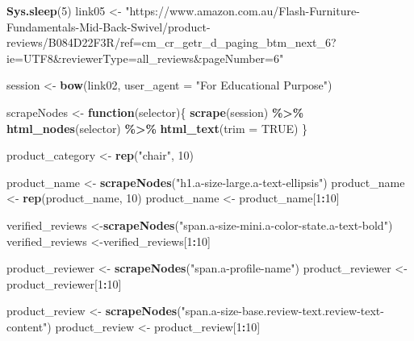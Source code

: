 \documentclass[
]{article}
\newenvironment{Shaded}{\begin{snugshade}}{\end{snugshade}}
\newcommand{\AttributeTok}[1]{\textcolor[rgb]{0.13,0.29,0.53}{#1}}
\newcommand{\ConstantTok}[1]{\textcolor[rgb]{0.56,0.35,0.01}{#1}}
\newcommand{\ControlFlowTok}[1]{\textcolor[rgb]{0.13,0.29,0.53}{\textbf{#1}}}
\newcommand{\DecValTok}[1]{\textcolor[rgb]{0.00,0.00,0.81}{#1}}
\newcommand{\FunctionTok}[1]{\textcolor[rgb]{0.13,0.29,0.53}{\textbf{#1}}}
\newcommand{\NormalTok}[1]{#1}
\newcommand{\OtherTok}[1]{\textcolor[rgb]{0.56,0.35,0.01}{#1}}
\newcommand{\SpecialCharTok}[1]{\textcolor[rgb]{0.81,0.36,0.00}{\textbf{#1}}}
\newcommand{\StringTok}[1]{\textcolor[rgb]{0.31,0.60,0.02}{#1}}
\begin{document}
\begin{Shaded}
\begin{Highlighting}[]
  \FunctionTok{Sys.sleep}\NormalTok{(}\DecValTok{5}\NormalTok{)}
\NormalTok{link05 }\OtherTok{\textless{}{-}} \StringTok{"https://www.amazon.com.au/Flash{-}Furniture{-}Fundamentals{-}Mid{-}Back{-}Swivel/product{-}reviews/B084D22F3R/ref=cm\_cr\_getr\_d\_paging\_btm\_next\_6?ie=UTF8\&reviewerType=all\_reviews\&pageNumber=6"}


\NormalTok{  session }\OtherTok{\textless{}{-}} \FunctionTok{bow}\NormalTok{(link02,}
               \AttributeTok{user\_agent =} \StringTok{"For Educational Purpose"}\NormalTok{)}

\NormalTok{  scrapeNodes }\OtherTok{\textless{}{-}} \ControlFlowTok{function}\NormalTok{(selector)\{}
    \FunctionTok{scrape}\NormalTok{(session) }\SpecialCharTok{\%\textgreater{}\%}
      \FunctionTok{html\_nodes}\NormalTok{(selector) }\SpecialCharTok{\%\textgreater{}\%}
      \FunctionTok{html\_text}\NormalTok{(}\AttributeTok{trim =} \ConstantTok{TRUE}\NormalTok{)}
\NormalTok{  \}}

\NormalTok{  product\_category }\OtherTok{\textless{}{-}} \FunctionTok{rep}\NormalTok{(}\StringTok{"chair"}\NormalTok{, }\DecValTok{10}\NormalTok{)}

\NormalTok{  product\_name }\OtherTok{\textless{}{-}} \FunctionTok{scrapeNodes}\NormalTok{(}\StringTok{"h1.a{-}size{-}large.a{-}text{-}ellipsis"}\NormalTok{)}
\NormalTok{  product\_name }\OtherTok{\textless{}{-}} \FunctionTok{rep}\NormalTok{(product\_name, }\DecValTok{10}\NormalTok{)}
\NormalTok{  product\_name }\OtherTok{\textless{}{-}}\NormalTok{ product\_name[}\DecValTok{1}\SpecialCharTok{:}\DecValTok{10}\NormalTok{]}
  
\NormalTok{  verified\_reviews }\OtherTok{\textless{}{-}}\FunctionTok{scrapeNodes}\NormalTok{(}\StringTok{"span.a{-}size{-}mini.a{-}color{-}state.a{-}text{-}bold"}\NormalTok{)}
\NormalTok{  verified\_reviews }\OtherTok{\textless{}{-}}\NormalTok{verified\_reviews[}\DecValTok{1}\SpecialCharTok{:}\DecValTok{10}\NormalTok{]}
  
\NormalTok{  product\_reviewer }\OtherTok{\textless{}{-}} \FunctionTok{scrapeNodes}\NormalTok{(}\StringTok{"span.a{-}profile{-}name"}\NormalTok{)}
\NormalTok{  product\_reviewer }\OtherTok{\textless{}{-}}\NormalTok{ product\_reviewer[}\DecValTok{1}\SpecialCharTok{:}\DecValTok{10}\NormalTok{]}
  
\NormalTok{  product\_review }\OtherTok{\textless{}{-}} \FunctionTok{scrapeNodes}\NormalTok{(}\StringTok{"span.a{-}size{-}base.review{-}text.review{-}text{-}content"}\NormalTok{)}
\NormalTok{  product\_review }\OtherTok{\textless{}{-}}\NormalTok{ product\_review[}\DecValTok{1}\SpecialCharTok{:}\DecValTok{10}\NormalTok{]}
  

\end{Highlighting}
\end{Shaded}
\end{document}
